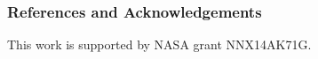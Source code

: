 \documentclass[landscape,xcolor={table},10pt]{beamer}
\begin{document}
\begin{frame}
\begin{columns}[T]
\begin{column}{.49\textwidth}
		\end{column}%
		\end{columns}

	\end{frame}
	
	\begin{frame}
		\frametitle{References and Acknowledgements}
		
			This work is supported by NASA grant NNX14AK71G. \\[2cm]
		
		
		
		
		
	\end{frame}
	
\end{document}
